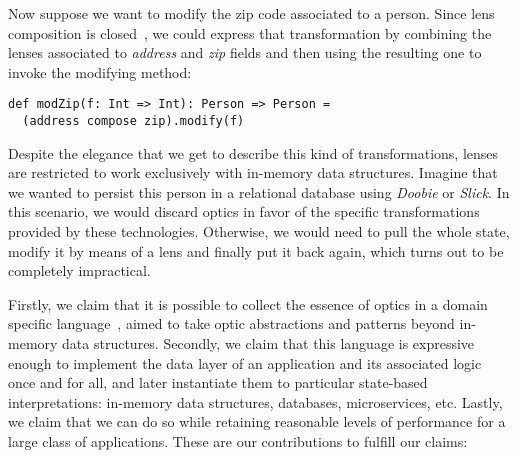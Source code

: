 \documentclass[preview, 3p]{elsarticle}
\begin{document}
Now suppose we want to modify the zip code associated to a person. Since lens
composition is closed~\cite{pickering2017profunctor}, we could express that
transformation by combining the lenses associated to \emph{address} and
\emph{zip} fields and then using the resulting one to invoke the modifying
method:

\begin{lstlisting}
def modZip(f: Int => Int): Person => Person =
  (address compose zip).modify(f)
\end{lstlisting}

Despite the elegance that we get to describe this kind of transformations,
lenses are restricted to work exclusively with in-memory data structures.
Imagine that we wanted to persist this person in a relational database using
\emph{Doobie} or \emph{Slick}. In this scenario, we would discard optics in
favor of the specific transformations provided by these technologies. Otherwise,
we would need to pull the whole state, modify it by means of a lens and finally
put it back again, which turns out to be completely impractical.

Firstly, we claim that it is possible to collect the essence of optics in a
domain specific language~\cite{hudak1996building}, aimed to take optic
abstractions and patterns beyond in-memory data structures. Secondly, we claim
that this language is expressive enough to implement the data layer of an
application and its associated logic once and for all, and later instantiate
them to particular state-based interpretations: in-memory data structures,
databases, microservices, etc. Lastly, we claim that we can do so while
retaining reasonable levels of performance for a large class of applications.
These are our contributions to fulfill our claims:
\end{document}
